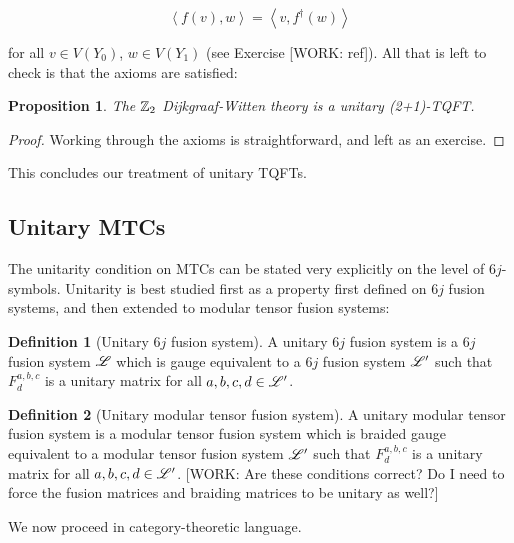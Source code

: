 \documentclass{article}
\newtheorem{proposition}{Proposition}[section]
\theoremstyle{definition}
\newtheorem*{definition}{Definition}
\numberwithin{figure}{section}
\begin{document}
$$\left<f(v),w\right>=\left<v,f^{\dagger}(w)\right>$$

for all $v\in V(Y_0)$, $w\in V(Y_1)$ (see Exercise [WORK: ref]). All that is left to check is that the axioms are satisfied:

\begin{proposition} The $\mathbb{Z}_2$ Dijkgraaf-Witten theory is a unitary (2+1)-TQFT.
\end{proposition}
\begin{proof} Working through the axioms is straightforward, and left as an exercise.
\end{proof}

This concludes our treatment of unitary TQFTs.

\subsection{Unitary MTCs}

The unitarity condition on MTCs can be stated very explicitly on the level of $6j$-symbols. Unitarity is best studied first as a property first defined on $6j$ fusion systems, and then extended to modular tensor fusion systems:

\begin{definition}[Unitary $6j$ fusion system] A unitary $6j$ fusion system is a $6j$ fusion system $\mathscr{L}$ which is gauge equivalent to a $6j$ fusion system $\mathscr{L}'$ such that $F^{a,b,c}_{d}$ is a unitary matrix for all $a,b,c,d\in \mathscr{L}'$.

\raggedleft\qedsymbol{}
\end{definition}


\begin{definition}[Unitary modular tensor fusion system] A unitary modular tensor fusion system is a modular tensor fusion system which is braided gauge equivalent to a modular tensor fusion system $\mathscr{L}'$ such that $F^{a,b,c}_{d}$ is a unitary matrix for all $a,b,c,d\in\mathscr{L}'$. [WORK: Are these conditions correct? Do I need to force the fusion matrices and braiding matrices to be unitary as well?]

\raggedleft\qedsymbol{}
\end{definition}

We now proceed in category-theoretic language.
\end{document}
